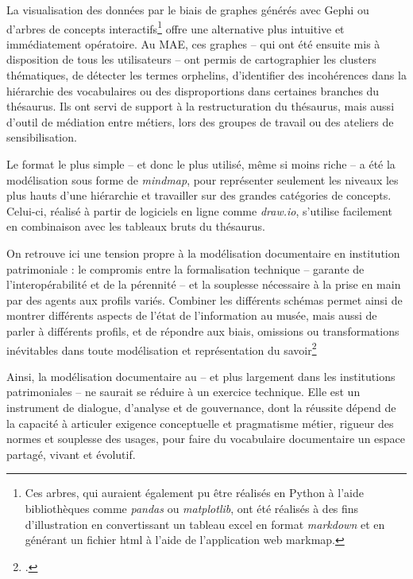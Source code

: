 La visualisation des données par le biais de graphes générés avec Gephi ou d'arbres de concepts interactifs\footnote{Ces arbres, qui auraient également pu être réalisés en Python à l'aide bibliothèques comme \textit{pandas} ou \textit{matplotlib}, ont été réalisés à des fins d'illustration en convertissant un tableau excel en format \textit{markdown} et en générant un fichier html à l'aide de l'application web markmap.} offre une alternative plus intuitive et immédiatement opératoire. Au MAE, ces graphes – qui ont été ensuite mis à disposition de tous les utilisateurs – ont permis de cartographier les clusters thématiques, de détecter les termes orphelins, d'identifier des incohérences dans la hiérarchie des vocabulaires ou des disproportions dans certaines branches du thésaurus. Ils ont servi de support à la restructuration du thésaurus, mais aussi d'outil de médiation entre métiers, lors des groupes de travail ou des ateliers de sensibilisation.

Le format le plus simple -- et donc le plus utilisé, même si moins riche -- a été la modélisation sous forme de \textit{mindmap}, pour représenter seulement les niveaux les plus hauts d'une hiérarchie et travailler sur des grandes catégories de concepts. Celui-ci,  réalisé à partir de logiciels en ligne comme \textit{draw.io}, s'utilise facilement en combinaison avec les tableaux bruts du thésaurus.

On retrouve ici une tension propre à la modélisation documentaire en institution patrimoniale : le compromis entre la formalisation technique – garante de l'interopérabilité et de la pérennité – et la souplesse nécessaire à la prise en main par des agents aux profils variés. Combiner les différents schémas permet ainsi de montrer différents aspects de l'état de l'information au musée, mais aussi de parler à différents profils, et de répondre aux biais, omissions ou transformations inévitables dans toute modélisation et représentation du savoir\footcite{bowkerArrangerChosesConsequences2023}

Ainsi, la modélisation documentaire au \mae – et plus largement dans les institutions patrimoniales – ne saurait se réduire à un exercice technique. Elle est un instrument de dialogue, d'analyse et de gouvernance, dont la réussite dépend de la capacité à articuler exigence conceptuelle et pragmatisme métier, rigueur des normes et souplesse des usages, pour faire du vocabulaire documentaire un espace partagé, vivant et évolutif.


 
